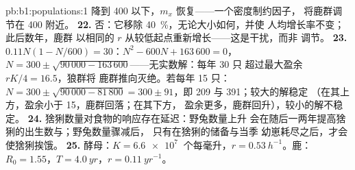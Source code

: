 \begin{solution}{pb:b1:populations:1}
降到 400 以下，$m_x$ 恢复——一个密度制约因子，
将鹿群调节在 400 附近。
\textbf{22.} 否：它移除 \qty{40}{\%}，无论大小如何，并使
人均增长率不变；此后数年，鹿群
以相同的 $r$ 从较低起点重新增长——这是干扰，而非
调节。
\textbf{23.} $0.11N(1 - N/600) = 30$：$N^2 - 600N + 163\,600 = 0$，
$N = 300\pm\sqrt{90\,000 - 163\,600}$——无实数解：每年 30 只
超过最大盈余 $rK/4 = 16.5$，狼群将
鹿群推向灭绝。若每年 15 只：$N = 300\pm\sqrt{90\,000 -
81\,800} = 300\pm 91$，即 209 与 391；较大的解稳定
（在其上方，盈余小于 15，鹿群回落；在其下方，
盈余更多，鹿群回升），较小的解不稳定。
\textbf{24.} 猞猁数量对食物的响应存在延迟：野兔数量上升
会在随后一两年提高猞猁的出生数与；野兔数量骤减后，
只有在猞猁的储备与当季
幼崽耗尽之后，才会使猞猁挨饿。
\textbf{25.} 酵母：$K = \qty{6.6e7}{}$ 个每毫升，$r =
\qty{0.53}{h^{-1}}$。鹿：$R_0 = 1.55$，$T = \qty{4.0}{yr}$，$r =
\qty{0.11}{yr^{-1}}$。
\end{solution}
